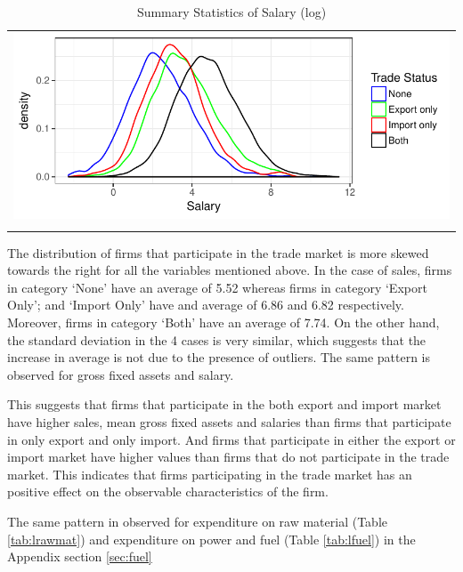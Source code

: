\documentclass[12pt]{article}
\begin{document}
\begin{center}
\begin{table}[H]
\caption{Summary Statistics of Salary (log)}
\label{tab:lsalary}
\begin{tabular}{c}
 \includegraphics{./PICS/denslsalary.pdf}   \\ 
   \\  
\end{tabular}
\end{table}
\end{center}

The distribution of firms that participate in the trade market is more skewed towards the right for all the
variables mentioned above. In the case of sales, firms in category
`None' have an average of 5.52 whereas firms in category `Export Only';
and `Import Only' have and average  of 6.86 and
6.82 respectively. Moreover, firms in category `Both' have an average
of  7.74.  On the other hand, the standard deviation in the 4 
cases is very similar, which suggests that the increase in average is
not due to the presence of outliers. The same pattern is observed for
gross fixed assets and salary.  

This suggests that firms that participate in the both export and import market have
higher sales, mean gross fixed assets and 
salaries  than firms that participate in
only export and only import.  And firms that participate in either the
export or import market have higher values  than firms that do not
participate in the trade market. This indicates that firms participating
in the trade market has an positive effect on the observable
characteristics of the firm.

The same pattern in observed for expenditure on raw material (Table \ref{tab:lrawmat}) and
expenditure on power and fuel (Table \ref{tab:lfuel}) in the Appendix
section \ref{sec:fuel}
\end{document}
